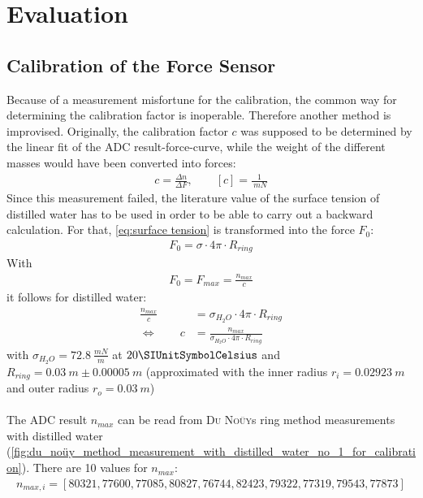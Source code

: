 \chapter{Evaluation}
%
    \section{Calibration of the Force Sensor}
        Because of a measurement misfortune for the calibration, the common way for determining the calibration factor is inoperable. Therefore another method is improvised. Originally, the calibration factor $ c $ was supposed to be determined by the linear fit of the ADC result-force-curve, while the weight of the different masses would have been converted into forces:
        \begin{align}
            c=\frac{\Delta n}{\Delta F}, \qquad [c]=\frac{1}{\SI{}{mN}}
        \end{align}
        Since this measurement failed, the literature value of the surface tension of distilled water has to be used in order to be able to carry out a backward calculation. For that, \cref{eq:surface tension} is transformed into the force $ F_0 $:
        \begin{align*}
            F_0=\sigma \cdot 4\pi \cdot R_{ring}
        \end{align*}
        With
        \begin{align}
            F_0=F_{max}=\frac{n_{max}}{c}
            \label{eq:force}
        \end{align}
        it follows for distilled water:
        \begin{align}
            \frac{n_{max}}{c}&=\sigma_{H_2O} \cdot 4\pi \cdot R_{ring} \nonumber \\
            \Leftrightarrow \qquad c&=\frac{n_{max}}{\sigma_{H_2O} \cdot 4\pi \cdot R_{ring}}
            \label{eq:calibration factor}
        \end{align}
        with $ \sigma_{H_2O}=\SI{72.8}{\frac{mN}{m}} $ at $ 20 \SIUnitSymbolCelsius $ \cite{Eichler.2016}
        and $ R_{ring}=\SI{0.03}{m} \pm \SI{0.00005}{m} $ (approximated with the inner radius $ r_i=\SI{0.02923}{m} $ and outer radius $ r_o=\SI{0.03}{m} $)
        \\\\
        The ADC result $ n_{max} $ can be read from \textsc{Du Noüy}s ring method measurements with distilled water (\cref{fig:du_noüy_method_measurement_with_distilled_water_no_1_for_calibration}). There are 10 values for $ n_{max} $:
        \begin{align*}
            n_{max,i}=[80321, 77600, 77085, 80827, 76744, 82423, 79322, 77319, 79543, 77873]
        \end{align*}
